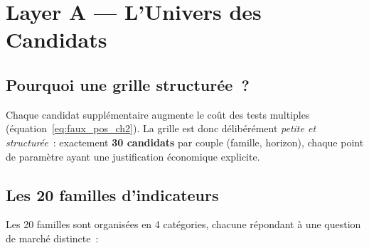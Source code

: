 \section{Layer A --- L'Univers des Candidats}
\label{sec:layer_a}

\subsection{Pourquoi une grille structurée~?}

Chaque candidat supplémentaire augmente le coût des tests multiples (équation~\eqref{eq:faux_pos_ch2}).
La grille est donc délibérément \emph{petite et structurée}~: exactement
\textbf{30 candidats} par couple (famille, horizon), chaque point de paramètre
ayant une justification économique explicite.

\subsection{Les 20 familles d'indicateurs}

Les 20 familles sont organisées en 4 catégories, chacune répondant à une question
de marché distincte~:

